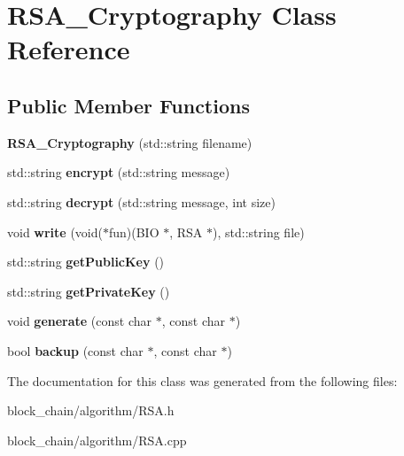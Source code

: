 \hypertarget{classRSA__Cryptography}{}\section{R\+S\+A\+\_\+\+Cryptography Class Reference}
\label{classRSA__Cryptography}
\subsection*{Public Member Functions}
\begin{DoxyCompactItemize}
\item 
\mbox{\label{classRSA__Cryptography_af3a17a2480f1a6d17f74bda756540d0f}} 
{\bfseries R\+S\+A\+\_\+\+Cryptography} (std\+::string filename)
\item 
\mbox{\label{classRSA__Cryptography_a8ea8d421dcb5012ffc8fd23660bae1bc}} 
std\+::string {\bfseries encrypt} (std\+::string message)
\item 
\mbox{\label{classRSA__Cryptography_a03760e4f7eae8e7b961f8b948c0dafb1}} 
std\+::string {\bfseries decrypt} (std\+::string message, int size)
\item 
\mbox{\label{classRSA__Cryptography_a7772b886bb2f27b95df33019d04eee69}} 
void {\bfseries write} (void($\ast$fun)(B\+IO $\ast$, R\+SA $\ast$), std\+::string file)
\item 
\mbox{\label{classRSA__Cryptography_a9692bde79db1e43da95511fe0d0c1a0b}} 
std\+::string {\bfseries get\+Public\+Key} ()
\item 
\mbox{\label{classRSA__Cryptography_aecdd6715cb222a98b5810f49103c34d7}} 
std\+::string {\bfseries get\+Private\+Key} ()
\item 
\mbox{\label{classRSA__Cryptography_ad2034c85765f03ab147e2ce01bb0e116}} 
void {\bfseries generate} (const char $\ast$, const char $\ast$)
\item 
\mbox{\label{classRSA__Cryptography_ac3747475168157d87c6661f0ac3f4f95}} 
bool {\bfseries backup} (const char $\ast$, const char $\ast$)
\end{DoxyCompactItemize}


The documentation for this class was generated from the following files\+:\begin{DoxyCompactItemize}
\item 
block\+\_\+chain/algorithm/R\+S\+A.\+h\item 
block\+\_\+chain/algorithm/R\+S\+A.\+cpp\end{DoxyCompactItemize}

